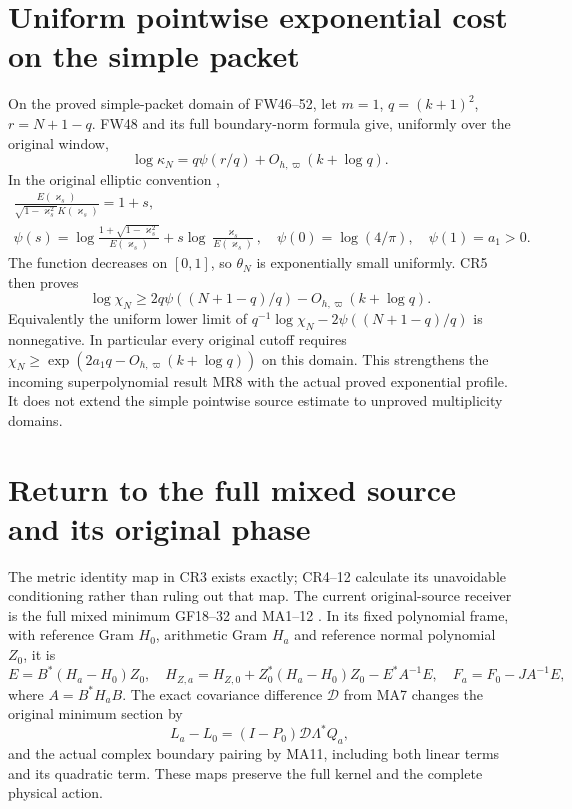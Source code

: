 \documentclass[11pt]{article}
\begin{document}
\section{Uniform pointwise exponential cost on the simple packet}
On the proved simple-packet domain of FW46--52, let
$m=1$, $q=(k+1)^2$, $r=N+1-q$. FW48 and its full boundary-norm
formula give, uniformly over the original window,
\[
 \log\kappa_N=q\psi(r/q)+O_{h,\varpi}(k+\log q).
\]
In the original elliptic convention \cite{CRCarlson,CRFW},
\begin{equation}\tag{CR11}\begin{gathered}
 \frac{E(\varkappa_s)}{\sqrt{1-\varkappa_s^2}K(\varkappa_s)}=1+s,\\
 \psi(s)=\log\frac{1+\sqrt{1-\varkappa_s^2}}{E(\varkappa_s)}
           +s\log\frac{\varkappa_s}{E(\varkappa_s)},\quad
 \psi(0)=\log(4/\pi),\quad\psi(1)=a_1>0.
\end{gathered}\end{equation}
The function decreases on $[0,1]$, so $\theta_N$ is exponentially
small uniformly. CR5 then proves
\begin{equation}\tag{CR12}\boxed{
 \log\chi_N\ge2q\psi((N+1-q)/q)-O_{h,\varpi}(k+\log q).}
\end{equation}
Equivalently the uniform lower limit of
$q^{-1}\log\chi_N-2\psi((N+1-q)/q)$ is nonnegative.
In particular every original cutoff requires
$\chi_N\ge\exp(2a_1q-O_{h,\varpi}(k+\log q))$ on this domain.
This strengthens the incoming superpolynomial result MR8 with the
actual proved exponential profile. It does not extend the simple
pointwise source estimate to unproved multiplicity domains.

\section{Return to the full mixed source and its original phase}
The metric identity map in CR3 exists exactly; CR4--12 calculate
its unavoidable conditioning rather than ruling out that map.
The current original-source receiver is the full mixed minimum
GF18--32 and MA1--12 \cite{CRGF,CRMA}. In its fixed polynomial frame,
with reference Gram $H_0$, arithmetic Gram $H_a$ and reference
normal polynomial $Z_0$, it is
\[
 E=B^*(H_a-H_0)Z_0,\quad
 H_{Z,a}=H_{Z,0}+Z_0^*(H_a-H_0)Z_0-E^*A^{-1}E,
 \quad F_a=F_0-JA^{-1}E,
 \tag{CR13}
\]
where $A=B^*H_aB$. The exact covariance difference $\mathcal D$
from MA7 changes the original minimum section by
\[
 L_a-L_0=(I-P_0)\mathcal D\Lambda^*Q_a,
\]
and the actual complex boundary pairing by MA11, including both
linear terms and its quadratic term. These maps preserve the full
kernel and the complete physical action.
\end{document}
